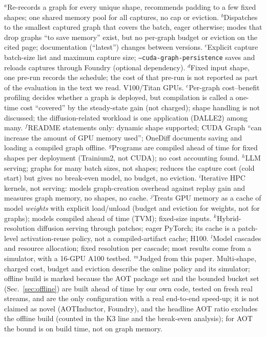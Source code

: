\documentclass[conference]{IEEEtran}
\newcommand{\cYes}{\ding{51}}
\begin{document}
\begin{table}[tbp]
\vspace{2pt}
\begin{minipage}{\columnwidth}
\scriptsize
$^{a}$Re-records a graph for every unique shape, recommends padding to a few fixed shapes; one shared memory pool for all captures, no cap or eviction.
$^{b}$Dispatches to the smallest captured graph that covers the batch, eager otherwise; modes that drop graphs ``to save memory'' exist, but no per-graph budget or eviction on the cited page; documentation (``latest'') changes between versions.
$^{c}$Explicit capture batch-size list and maximum capture size; \texttt{--cuda-graph-persistence} saves and reloads captures through Foundry (optional dependency).
$^{d}$Fixed input shape, one pre-run records the schedule; the cost of that pre-run is not reported as part of the evaluation in the text we read. V100/Titan GPUs.
$^{e}$Per-graph cost--benefit profiling decides whether a graph is deployed, but compilation is called a one-time cost ``covered'' by the steady-state gain (not charged); shape handling is not discussed; the diffusion-related workload is one application (DALLE2) among many.
$^{f}$README statements only: dynamic shape supported; CUDA Graph ``can increase the amount of GPU memory used''; OneDiff documents saving and loading a compiled graph offline.
$^{g}$Programs are compiled ahead of time for fixed shapes per deployment (Trainium2, not CUDA); no cost accounting found.
$^{h}$LLM serving; graphs for many batch sizes, not shapes; reduces the capture cost (cold start) but gives no break-even model, no budget, no eviction.
$^{i}$Iterative HPC kernels, not serving: models graph-creation overhead against replay gain and measures graph memory, no shapes, no cache.
$^{j}$Treats GPU memory as a cache of model \emph{weights} with explicit load/unload (budget and eviction for weights, not for graphs); models compiled ahead of time (TVM); fixed-size inputs.
$^{k}$Hybrid-resolution diffusion serving through patches; eager PyTorch; its cache is a patch-level activation-reuse policy, not a compiled-artifact cache; H100.
$^{l}$Model cascades and resource allocation; fixed resolution per cascade; most results come from a simulator, with a 16-GPU A100 testbed.
$^{m}$Judged from this paper. Multi-shape, charged cost, budget and eviction describe the online policy and its simulator; offline build is marked \cYes{} because the AOT package set and the bounded bucket set (Sec.~\ref{sec:offline}) are built ahead of time by our own code, tested on fresh real streams, and are the only configuration with a real end-to-end speed-up; it is not claimed as novel (AOTInductor, Foundry), and the headline AOT ratio excludes the offline build (counted in the K3 line and the break-even analysis); for AOT the bound is on build time, not on graph memory.
\end{minipage}
\end{table}
\end{document}
